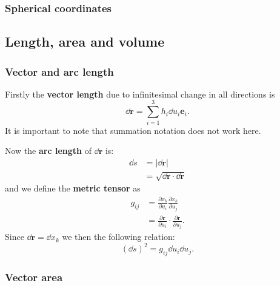 \documentclass{article}
\begin{document}
\subsubsection{Spherical coordinates}

\newpage

\subsection{Length, area and volume}

\subsubsection{Vector and arc length}
Firstly the \textbf{vector length} due to infinitesimal change in all directions is
$$\dd\boldsymbol{r}=\sum_{i=1}^{3}h_i\dd u_i\boldsymbol{e}_i.$$
It is important to note that summation notation does not work here.

Now the \textbf{arc length} of $\dd\boldsymbol{r}$ is:
\begin{align*}
    \dd s
    &=|\dd\boldsymbol{r}| \\
    &=\sqrt{\dd\boldsymbol{r}\cdot\dd\boldsymbol{r}}
\end{align*}
and we define the \textbf{metric tensor} as
\begin{align*}
    g_{ij}
    &=\frac{\partial x_k}{\partial u_i}\frac{\partial x_k}{\partial u_j} \\
    &=\frac{\partial\boldsymbol{r}}{\partial u_i}
    \cdot\frac{\partial\boldsymbol{r}}{\partial u_j}.
\end{align*}
Since $\dd\boldsymbol{r}=\dd x_k$ we then the following relation:
$$(\dd s)^2=g_{ij}\dd u_i\dd u_j.$$

\newpage

\subsubsection{Vector area}
\end{document}

